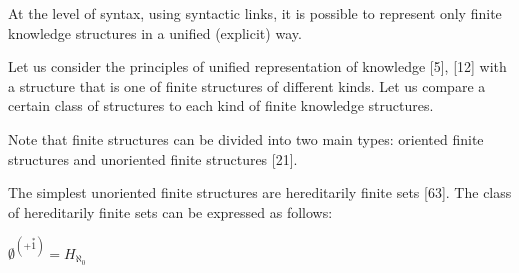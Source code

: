 \documentclass {article}
\begin{document}
\begin{multicols}{2}
At the level of syntax, using syntactic links, it is
possible to represent only finite knowledge structures in
a unified (explicit) way.
\par Let us consider the principles of unified representation
of knowledge [5], [12] with a structure that is one of finite
structures of different kinds. Let us compare a certain
class of structures to each kind of finite knowledge
structures.
\par Note that finite structures can be divided into two main
types: oriented finite structures and unoriented finite
structures [21].
\par The simplest unoriented finite structures are hereditarily finite sets [63]. The class of hereditarily finite sets
can be expressed as follows:
\par
\begin{center}
\begin{math}
\emptyset^{(+ \overset{*}{1})} = H_{\aleph_0}
\end{math}
\end{center}
\end{multicols}
\end{document}
